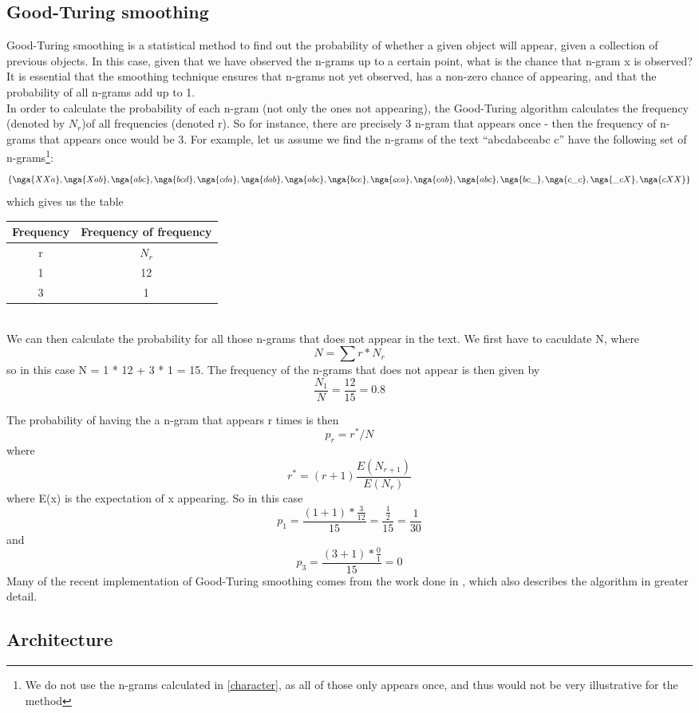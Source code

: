 \subsection{Good-Turing smoothing}
\label{Good-Turing}
Good-Turing smoothing is a statistical method to find out the probability of whether a given object will appear, given a collection of previous objects. In this case, given that we have observed the n-grams up to a certain point, what is the chance that n-gram x is observed? It is essential that the smoothing technique ensures that n-grams not yet observed, has a non-zero chance of appearing, and that the probability of all n-grams add up to 1.\\

In order to calculate the probability of each n-gram (not only the ones not appearing), the Good-Turing algorithm calculates the frequency (denoted by $N_r$)of all frequencies (denoted r). So for instance, there are precisely 3 n-gram that appears once - then the frequency of n-grams that appears once would be 3. For example, let us assume we find the n-grams of the text ``abcdabceabc c'' have the following set of n-grams\footnote{We do not use the n-grams calculated in \ref{character}, as all of those only appears once, and thus would not be very illustrative for the method}:\\
$$
\{\nga{XXa}, \nga{Xab}, \nga{abc}, \nga{bcd}, \nga{cda}, \nga{dab}, \nga{abc}, \nga{bce}, \nga{cea}, \nga{eab}, \nga{abc}, \nga{bc\_}, \nga{c\_c}, \nga{\_cX}, \nga{cXX} \}
$$
which gives us the table\\
\begin{tabular}{|cc|}
\hline
Frequency & Frequency of frequency \\
\hline
r & $N_{r}$ \\
1 & 12\\
3 & 1\\
\hline
\end{tabular}
\\
We can then calculate the probability for all those n-grams that does not appear in the text. We first have to caculdate N, where 
$$
N = \sum r * N_r
$$
so in this case N = 1 * 12 + 3 * 1 = 15. The frequency of the n-grams that does not appear is then given by 
$$
\frac{N_1}{N} = \frac{12}{15} = 0.8
$$

The probability of having the a n-gram that appears r times is then 
$$p_r = r^*/N$$
 where 
$$r^* = (r+1)\frac{E(N_{r+1})}{E(N_r)}$$
 where E(x) is the expectation of x appearing. So in this case 
$$p_1 = \frac{(1 + 1) * \frac{3}{12}}{15} = \frac{\frac{1}{2}}{15} = \frac{1}{30}$$ and  
$$p_3 = \frac{(3 + 1) * \frac{0}{1}}{15} = 0$$
Many of the recent implementation of Good-Turing smoothing comes from the work done in \cite{Gale94good-turingsmoothing}, which also describes the algorithm in greater detail.

\subsection{Architecture}
